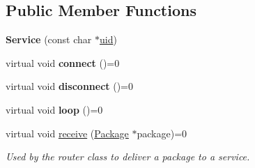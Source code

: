 \subsection*{Public Member Functions}
\begin{DoxyCompactItemize}
\item 
{\bfseries Service} (const char $\ast$\hyperlink{class_bottle_buddy_1_1_embedded_1_1_pipeline_1_1_service_af290f9aa0a6dca36e802e615fab19f78}{uid})\hypertarget{class_bottle_buddy_1_1_embedded_1_1_pipeline_1_1_service_aa1d9175f0ae927feec2b0bc9db8b3967}{}\label{class_bottle_buddy_1_1_embedded_1_1_pipeline_1_1_service_aa1d9175f0ae927feec2b0bc9db8b3967}

\item 
virtual void {\bfseries connect} ()=0\hypertarget{class_bottle_buddy_1_1_embedded_1_1_pipeline_1_1_service_a815f0eefef7a86e48fa9ddf2a74a36a0}{}\label{class_bottle_buddy_1_1_embedded_1_1_pipeline_1_1_service_a815f0eefef7a86e48fa9ddf2a74a36a0}

\item 
virtual void {\bfseries disconnect} ()=0\hypertarget{class_bottle_buddy_1_1_embedded_1_1_pipeline_1_1_service_abc5f5deb726cf0f4edd4ab3bbdd95106}{}\label{class_bottle_buddy_1_1_embedded_1_1_pipeline_1_1_service_abc5f5deb726cf0f4edd4ab3bbdd95106}

\item 
virtual void {\bfseries loop} ()=0\hypertarget{class_bottle_buddy_1_1_embedded_1_1_pipeline_1_1_service_ab2e3087822ea3768ce176b64b43ec706}{}\label{class_bottle_buddy_1_1_embedded_1_1_pipeline_1_1_service_ab2e3087822ea3768ce176b64b43ec706}

\item 
virtual void \hyperlink{class_bottle_buddy_1_1_embedded_1_1_pipeline_1_1_service_aaa0ee18450e47f2ad51d9934a2d61992}{receive} (\hyperlink{class_bottle_buddy_1_1_embedded_1_1_pipeline_1_1_package}{Package} $\ast$package)=0
\begin{DoxyCompactList}\small\item\em Used by the router class to deliver a package to a service. \end{DoxyCompactList}\end{DoxyCompactItemize}
